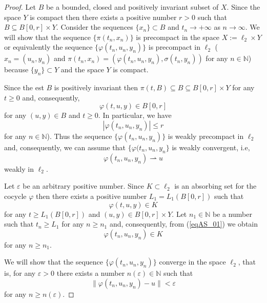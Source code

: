 \documentclass[10pt,a4paper]{amsart}
\begin{document}
\begin{proof} Let $B$ be a bounded, closed and positively invariant
subset of $X$. Since the space $Y$ is compact then there exists a
positive number $r>0$ such that $B\subseteq B[0,r]\times Y$.
Consider the sequences $\{x_n\}\subset B$ and $t_n\to +\infty$ as
$n\to \infty$. We will show that the sequence $\{\pi(t_n,x_n)\}$
is precompact in the space $X:=\ell_{2}\times Y$ or equivalently
the sequence $\{\varphi(t_n,u_n,y_n)\}$ is precompact in
$\ell_{2}$ ($x_n=(u_n,y_n)$ and
$\pi(t_n,x_n)=(\varphi(t_n,u_n,y_n),\sigma(t_n,y_n))$ for any
$n\in \mathbb N$) because $\{y_n\}\subset Y$ and the space $Y$ is
compact.

Since the est $B$ is positively invariant then $\pi(t,B)\subseteq
B\subseteq B[0,r]\times Y$ for any $t\ge 0$ and, consequently,
\begin{equation}\label{eqBK1}
\varphi(t,u,y)\in B[0,r] \nonumber
\end{equation}
for any $(u,y)\in B$ and $t\ge 0$. In particular, we have
\begin{equation}\label{BK2}
|\varphi(t_n,u_n,y_n)|\le r \nonumber
\end{equation}
for any $n\in \mathbb N$). Thus the sequence
$\{\varphi(t_n,u_n,y_n)\}$ is weakly precompact in $\ell_{2}$ and,
consequently, we can assume that $\{\varphi(t_n,u_n,y_n\}$ is
weakly convergent, i.e,
\begin{equation}\label{eqWC1}
\varphi(t_n,u_n,y_n)\rightharpoonup u \nonumber
\end{equation}
weakly in $\ell_{2}$.

Let $\varepsilon$ be an arbitrary positive number. Since $K\subset
\ell_{2}$ is an absorbing set for the cocycle $\varphi$ then there
exists a positive number $L_{1}=L_{1}(B[0,r])$ such that
\begin{equation}\label{eqAS_01}
\varphi(t,u,y)\in K
\end{equation}
for any $t\ge L_{1}(B[0,r])$ and $(u,y)\in B[0,r]\times Y$. Let
$n_1\in \mathbb N$ be a number such that $t_n\ge L_{1}$ for any
$n\ge n_1$ and, consequently, from (\ref{eqAS_01}) we obtain
\begin{equation}\label{eqAS_2}
\varphi(t_n,u_n,y_n)\in K
\end{equation}
for any $n\ge n_1$.

We will show that the sequence $\{\varphi(t_n,u_n,y_n)\}$ converge
in the space $\ell_{2}$, that is, for any $\varepsilon >0$ there
exists a number $n(\varepsilon)\in \mathbb N$ such that
\begin{equation}\label{eqAS3}
\|\varphi(t_n,u_n,y_n)-u\|<\varepsilon \nonumber
\end{equation}
for any $n\ge n(\varepsilon)$.


\end{proof}
\end{document}
